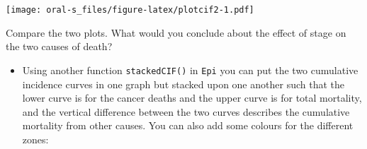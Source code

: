 \documentclass[
]{book}
\newenvironment{Shaded}{\begin{snugshade}}{\end{snugshade}}
\newcommand{\AttributeTok}[1]{\textcolor[rgb]{0.13,0.29,0.53}{#1}}
\newcommand{\DecValTok}[1]{\textcolor[rgb]{0.00,0.00,0.81}{#1}}
\newcommand{\FloatTok}[1]{\textcolor[rgb]{0.00,0.00,0.81}{#1}}
\newcommand{\FunctionTok}[1]{\textcolor[rgb]{0.13,0.29,0.53}{\textbf{#1}}}
\newcommand{\NormalTok}[1]{#1}
\newcommand{\SpecialCharTok}[1]{\textcolor[rgb]{0.81,0.36,0.00}{\textbf{#1}}}
\newcommand{\StringTok}[1]{\textcolor[rgb]{0.31,0.60,0.02}{#1}}
\providecommand{\tightlist}{%
  \setlength{\itemsep}{0pt}\setlength{\parskip}{0pt}}
\begin{document}
\begin{Shaded}
\end{Shaded}

\texttt{[image: oral-s\_files/figure-latex/plotcif2-1.pdf]}

Compare the two plots. What would you conclude about the
effect of stage on the two causes of death?

\begin{itemize}
\tightlist
\item
  Using another function \texttt{stackedCIF()} in \texttt{Epi} you can
  put the two cumulative incidence curves in one graph but stacked upon one another such that
  the lower curve is for the cancer deaths and the upper curve is for total mortality,
  and the vertical difference between the two curves describes the
  cumulative mortality from other causes. You can also add some colours for the different zones:
\end{itemize}
\end{document}
